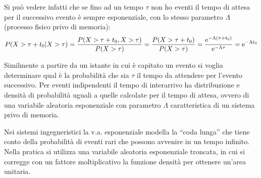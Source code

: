 Si può vedere infatti che se fino ad un tempo $\tau$ non ho eventi il tempo di attesa per il successivo evento è sempre esponenziale, con lo stesso parametro $\Lambda$ (processo fisico privo di memoria):
\[
	P(X>\tau+t_0|X>\tau)=\frac{P(X>\tau+t_0,X>\tau)}{P(X>\tau)}=\frac{P(X>\tau+t_0)}{P(X>\tau)}=\frac{\operatorname{e}^{-\Lambda(\tau+t_0)}}{\operatorname{e}^{-\Lambda\tau}}=\operatorname{e}^{-\Lambda t_0}
\]

Similmente a partire da un istante in cui è capitato un evento si voglia determinare qual è la probabilità che sia $\tau$ il tempo da attendere per l'evento successivo. Per eventi indipendenti il tempo di interarrivo ha distribuzione e densità di probabilità uguali a quelle calcolate per il tempo di attesa, ovvero di una variabile aleatoria esponenziale con parametro $\Lambda$ caratteristica di un sistema privo di memoria.

\begin{nota}
	Nei sistemi ingegneristici la v.a. esponenziale modella la “coda lunga” che tiene conto della probabilità di eventi rari che possono avvenire in un tempo infinito. Nella pratica si utilizza una variabile aleatoria esponenziale troncata, in cui si corregge con un fattore moltiplicativo la funzione densità per ottenere un'area unitaria.
\end{nota}

